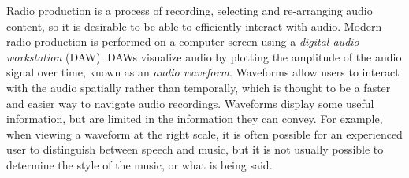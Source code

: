 
Radio production is a process of recording, selecting and re-arranging audio content, so it is desirable to be able to
efficiently interact with audio.  Modern radio production is performed on a computer screen using a \textit{digital
audio workstation} (DAW). DAWs visualize audio by plotting the amplitude of the audio signal over time, known as an
\textit{audio waveform}.  Waveforms allow users to interact with the audio spatially rather than temporally, which is
thought to be a faster and easier way to navigate audio recordings.  Waveforms display some useful information, but are
limited in the information they can convey.  For example, when viewing a waveform at the right scale, it is often
possible for an experienced user to distinguish between speech and music, but it is not usually possible to determine
the style of the music, or what is being said.




